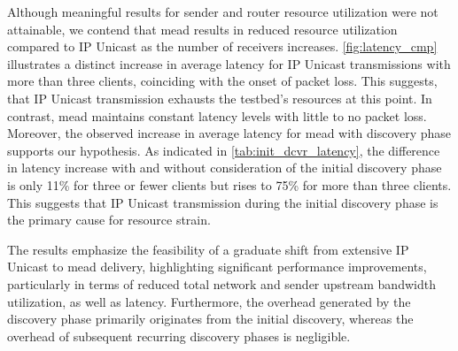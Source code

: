 \begin{itemize}
    Although meaningful results for sender and router resource utilization were
        not attainable, we contend that \gls{mead} results in reduced resource
        utilization compared to IP Unicast as the number of receivers
        increases.
    \autoref{fig:latency_cmp} illustrates a distinct increase in average
        latency for IP Unicast transmissions with more than three clients,
        coinciding with the onset of packet loss.
    This suggests, that IP Unicast transmission exhausts the testbed's
        resources at this point.
    In contrast, \gls{mead} maintains constant latency levels with little to no
        packet loss.
    Moreover, the observed increase in average latency for \gls{mead} with
        discovery phase supports our hypothesis.
    As indicated in \autoref{tab:init_dcvr_latency}, the difference in latency
        increase with and without consideration of the initial discovery phase
        is only 11\% for three or fewer clients but rises to 75\% for more than
        three clients.
    This suggests that IP Unicast transmission during the initial discovery
        phase is the primary cause for resource strain.

    The results emphasize the feasibility of a graduate shift from extensive
        IP Unicast to \gls{mead} delivery, highlighting significant performance
        improvements, particularly in terms of reduced total network and sender
        upstream bandwidth utilization, as well as latency.
    Furthermore, the overhead generated by the discovery phase primarily
        originates from the initial discovery, whereas the overhead of
        subsequent recurring discovery phases is negligible.
\end{itemize}

